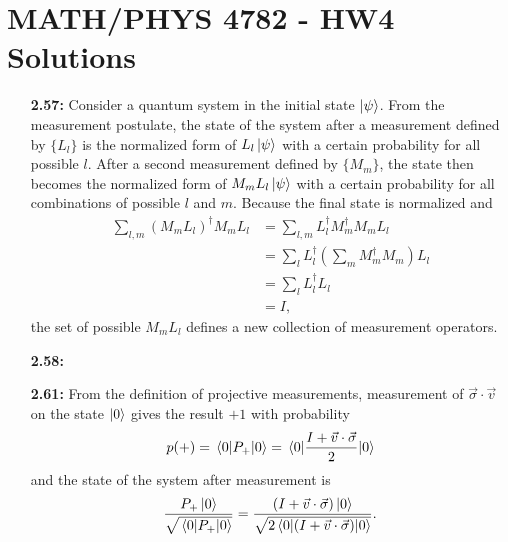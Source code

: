 \documentclass[a4paper,12pt]{article}
\begin{document}
	
\section*{MATH/PHYS 4782 - HW4 Solutions}

\begin{enumerate}
    \item[\textbf{2.57:}]
        Consider a quantum system in the initial state $\ket{\psi}$. From the measurement postulate, the state of the system after a measurement defined by $\{ L_l \}$ is the normalized form of $L_l \ket{\psi}$ with a certain probability for all possible $l$. After a second measurement defined by $\{ M_m \}$, the state then becomes the normalized form of $M_m L_l \ket{\psi}$ with a certain probability for all combinations of possible $l$ and $m$. Because the final state is normalized and
        \begin{align*}
            \sum_{l, m} (M_m L_l)^\dagger M_m L_l &= \sum_{l, m} L_l^\dagger M_m^\dagger M_m L_l \\
            &= \sum_l L_l^\dagger (\sum_m M_m^\dagger M_m) L_l \\
            &= \sum_l L_l^\dagger L_l \\
            &= I,
        \end{align*}
        the set of possible $M_m L_l$ defines a new collection of measurement operators.

    \item[\textbf{2.58:}]

    \item[\textbf{2.61:}]
        From the definition of projective measurements, measurement of $\vec{\sigma} \cdot \vec{v}$ on the state $\ket{0}$ gives the result $+1$ with probability
        \begin{align*}
            p(+) = \expval{P_+}{0} = \expval{\frac{I + \vec{v} \cdot \vec{\sigma}}{2}}{0}
        \end{align*}
        and the state of the system after measurement is
        \begin{align*}
            \frac{P_+ \ket{0}}{\sqrt{\expval{P_+}{0}}} = \frac{(I + \vec{v} \cdot \vec{\sigma}) \ket{0}}{\sqrt{2 \expval{(I + \vec{v} \cdot \vec{\sigma})}{0}}}.
        \end{align*}


\end{enumerate}
\end{document}
